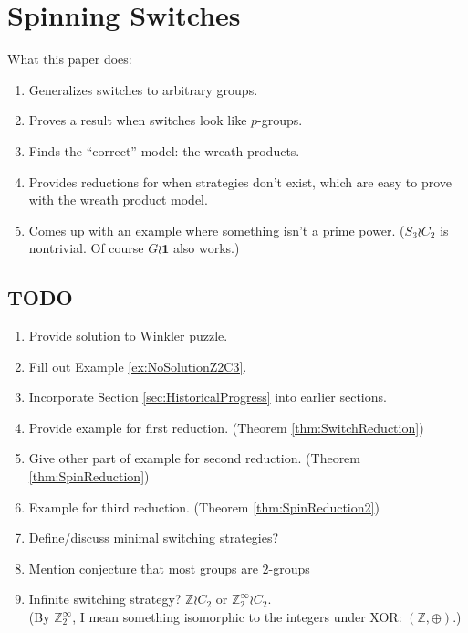 \chapter{Spinning Switches}
\label{cha:research_topic_1}

What this paper does:
\begin{enumerate}
  \item Generalizes switches to arbitrary groups.
  \item Proves a result when switches look like $p$-groups.
  \item Finds the ``correct'' model: the wreath products.
  \item Provides reductions for when strategies don't exist, which are easy to prove with the wreath product model.
  \item Comes up with an example where something isn't a prime power. ($S_3 \wr C_2$ is nontrivial. Of course $G \wr \mathbf{1}$ also works.)
\end{enumerate}

\section{TODO}
\begin{enumerate}
  \item Provide solution to Winkler puzzle.
  \item Fill out Example \ref{ex:NoSolutionZ2C3}.
  \item Incorporate Section \ref{sec:HistoricalProgress} into earlier sections.
  \item Provide example for first reduction. (Theorem \ref{thm:SwitchReduction})
  \item Give other part of example for second reduction. (Theorem \ref{thm:SpinReduction})
  \item Example for third reduction. (Theorem \ref{thm:SpinReduction2})
  \item Define/discuss minimal switching strategies?
  \item Mention conjecture that most groups are $2$-groups
  \item Infinite switching strategy?
    $\mathbb{Z} \wr C_2$ or $\mathbb{Z}_2^\infty \wr C_2$. \\
    (By $\mathbb{Z}_2^\infty$, I mean something isomorphic to the integers under
    XOR: $(\mathbb{Z}, \oplus)$.)
\end{enumerate}

